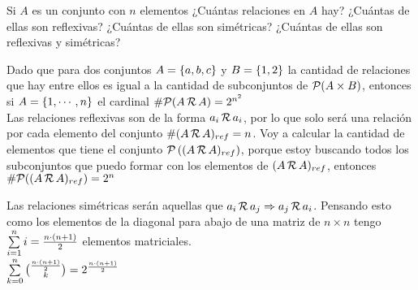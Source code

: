 \documentclass[12pt,a4paper, spanish]{article}
\begin{document}
\ejercicio
Si $A$ es un conjunto con $n$ elementos ¿Cuántas relaciones en $A$ hay?
¿Cuántas de ellas son reflexivas?
¿Cuántas de  ellas son simétricas? ¿Cuántas de ellas son reflexivas y simétricas? \\

\separadorCorto

Dado que para dos conjuntos $A = \left\{ a,b,c \right\}$ y $B = \left\{ 1,2 \right\}$ la cantidad de relaciones
que hay entre ellos es igual a la cantidad de subconjuntos de $\mathcal P(A \times B)$, entonces si
$A = \left\{ 1,\cdots, n \right\}$ el cardinal $\# \mathcal P(A \,\mathcal{R}\, A ) = 2^{n^2}$\\

Las relaciones reflexivas son de la forma $a_i \,\mathcal{R}\, a_i$, por lo que solo será una relación por cada
elemento del conjunto $\# (A \,\mathcal{R}\, A)_{ref} = n$. Voy a calcular la cantidad de elementos que tiene
el conjunto $\mathcal P \left(  (A \,\mathcal{R}\, A)_{ref}  \right)$, porque estoy buscando todos los subconjuntos que puedo
formar con los elementos de $(A \,\mathcal{R}\, A)_{ref}$, entonces $ \#\mathcal P((A \,\mathcal{R}\, A)_{ref}) = 2^n$\\

Las relaciones simétricas serán aquellas que $a_i \,\mathcal{R}\, a_j \Rightarrow a_j \,\mathcal{R}\, a_i$. Pensando esto como los elementos de la diagonal
para abajo de una matriz de $n\times n$ tengo $\sum\limits_{i=1}^{n} i = \frac{n \cdot (n+1)}{2}$ elementos matriciales.\\
$\sum\limits_{k = 0}^{n} \binom{\frac{n \cdot (n+1)}{2}}{k} = 2^{\frac{n \cdot (n+1)}{2}}$
\end{document}

